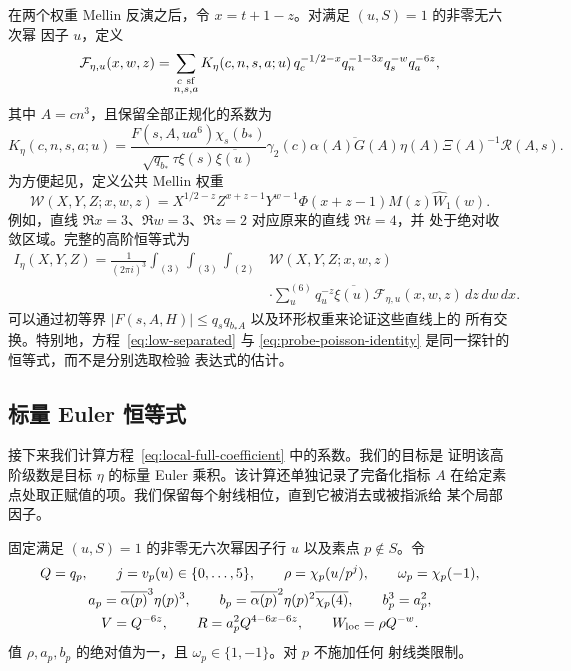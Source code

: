 \documentclass[11pt,a4paper]{article}
\numberwithin{equation}{section}
\numberwithin{figure}{section}
\theoremstyle{definition}
\theoremstyle{remark}
\begin{document}
在两个权重 Mellin 反演之后，令 $x=t+1-z$。对满足 $(u,S)=1$ 的非零无六次幂
因子 $u$，定义
\begin{equation}\label{eq:local-full-series}
 \mathcal F_{\eta,u}(x,w,z)=
 \sum_{\substack{c\ {\rm sf}\\n,s,a}}
 K_\eta(c,n,s,a;u)\,
 q_c^{-1/2-x}q_n^{-1-3x}q_s^{-w}q_a^{-6z},
\end{equation}
其中 $A=cn^3$，且保留全部正规化的系数为
\begin{equation}\label{eq:local-full-coefficient}
 K_\eta(c,n,s,a;u)=
 \frac{F(s,A,ua^6)\chi_s(b_*)}
 {\sqrt{q_{b_*}}\tau\xi(s)\overline{\xi(u)}}
 \gamma_2(c)\overline{\alpha(A)G(A)}
 \eta(A)\Xi(A)^{-1}\mathcal R(A,s).
\end{equation}
为方便起见，定义公共 Mellin 权重
\[
 \mathcal W(X,Y,Z;x,w,z)=
 X^{1/2-z}Z^{x+z-1}Y^{w-1}
 \Phi(x+z-1)M(z)\widehat W_1(w).
\]
例如，直线 $\Re x=3$、$\Re w=3$、$\Re z=2$ 对应原来的直线 $\Re t=4$，并
处于绝对收敛区域。完整的高阶恒等式为
\begin{equation}\label{eq:probe-poisson-identity}
 \begin{split}
 I_\eta(X,Y,Z)=\frac1{(2\pi i)^3}
 \int_{(3)}\int_{(3)}\int_{(2)}
 &\mathcal W(X,Y,Z;x,w,z)\\
 &\cdot\sum_u^{(6)}q_u^{-z}\overline{\xi(u)}
             \mathcal F_{\eta,u}(x,w,z)\,dz\,dw\,dx.
 \end{split}
\end{equation}
可以通过初等界 $|F(s,A,H)|\le q_sq_{b_*A}$ 以及环形权重来论证这些直线上的
所有交换。特别地，方程~\eqref{eq:low-separated} 与
\eqref{eq:probe-poisson-identity} 是同一探针的恒等式，而不是分别选取检验
表达式的估计。


\subsection{标量 Euler 恒等式}
\label{sec:local-euler}

接下来我们计算方程~\eqref{eq:local-full-coefficient} 中的系数。我们的目标是
证明该高阶级数是目标 $\eta$ 的标量 Euler 乘积。该计算还单独记录了完备化指标
$A$ 在给定素点处取正赋值的项。我们保留每个射线相位，直到它被消去或被指派给
某个局部因子。

固定满足 $(u,S)=1$ 的非零无六次幂因子行 $u$ 以及素点 $p\notin S$。令
\begin{equation}\label{eq:local-parameters}
 \begin{gathered}
 Q=q_p,\qquad j=v_p(u)\in\{0,\ldots,5\},\qquad
 \rho=\chi_p(u/p^j),\qquad \omega_p=\chi_p(-1),\\
 a_p=\overline{\alpha(p)}^3\eta(p)^3,\qquad
 b_p=\overline{\alpha(p)}^2\eta(p)^2\overline{\chi_p(4)},
 \qquad b_p^3=a_p^2,\\
 V=Q^{-6z},\qquad R=a_p^2Q^{4-6x-6z},\qquad
 W_{\rm loc}=\rho Q^{-w}.
 \end{gathered}
\end{equation}
值 $\rho,a_p,b_p$ 的绝对值为一，且 $\omega_p\in\{1,-1\}$。对 $p$ 不施加任何
射线类限制。
\end{document}
